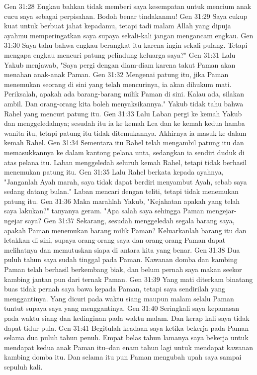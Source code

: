Gen 31:28  Engkau bahkan tidak memberi saya kesempatan untuk mencium anak cucu saya sebagai perpisahan. Bodoh benar tindakanmu!
Gen 31:29  Saya cukup kuat untuk berbuat jahat kepadamu, tetapi tadi malam Allah yang dipuja ayahmu memperingatkan saya supaya sekali-kali jangan mengancam engkau.
Gen 31:30  Saya tahu bahwa engkau berangkat itu karena ingin sekali pulang. Tetapi mengapa engkau mencuri patung pelindung keluarga saya?"
Gen 31:31  Lalu Yakub menjawab, "Saya pergi dengan diam-diam karena takut Paman akan menahan anak-anak Paman.
Gen 31:32  Mengenai patung itu, jika Paman menemukan seorang di sini yang telah mencurinya, ia akan dihukum mati. Periksalah, apakah ada barang-barang milik Paman di sini. Kalau ada, silakan ambil. Dan orang-orang kita boleh menyaksikannya." Yakub tidak tahu bahwa Rahel yang mencuri patung itu.
Gen 31:33  Lalu Laban pergi ke kemah Yakub dan menggeledahnya; sesudah itu ia ke kemah Lea dan ke kemah kedua hamba wanita itu, tetapi patung itu tidak ditemukannya. Akhirnya ia masuk ke dalam kemah Rahel.
Gen 31:34  Sementara itu Rahel telah mengambil patung itu dan memasukkannya ke dalam kantong pelana unta, sedangkan ia sendiri duduk di atas pelana itu. Laban menggeledah seluruh kemah Rahel, tetapi tidak berhasil menemukan patung itu.
Gen 31:35  Lalu Rahel berkata kepada ayahnya, "Janganlah Ayah marah, saya tidak dapat berdiri menyambut Ayah, sebab saya sedang datang bulan." Laban mencari dengan teliti, tetapi tidak menemukan patung itu.
Gen 31:36  Maka marahlah Yakub, "Kejahatan apakah yang telah saya lakukan?" tanyanya geram. "Apa salah saya sehingga Paman mengejar-ngejar saya?
Gen 31:37  Sekarang, sesudah menggeledah segala barang saya, apakah Paman menemukan barang milik Paman? Keluarkanlah barang itu dan letakkan di sini, supaya orang-orang saya dan orang-orang Paman dapat melihatnya dan memutuskan siapa di antara kita yang benar.
Gen 31:38  Dua puluh tahun saya sudah tinggal pada Paman. Kawanan domba dan kambing Paman telah berhasil berkembang biak, dan belum pernah saya makan seekor kambing jantan pun dari ternak Paman.
Gen 31:39  Yang mati diterkam binatang buas tidak pernah saya bawa kepada Paman, tetapi saya sendirilah yang menggantinya. Yang dicuri pada waktu siang maupun malam selalu Paman tuntut supaya saya yang menggantinya.
Gen 31:40  Seringkali saya kepanasan pada waktu siang dan kedinginan pada waktu malam. Dan kerap kali saya tidak dapat tidur pula.
Gen 31:41  Begitulah keadaan saya ketika bekerja pada Paman selama dua puluh tahun penuh. Empat belas tahun lamanya saya bekerja untuk mendapat kedua anak Paman itu--dan enam tahun lagi untuk mendapat kawanan kambing domba itu. Dan selama itu pun Paman mengubah upah saya sampai sepuluh kali.
